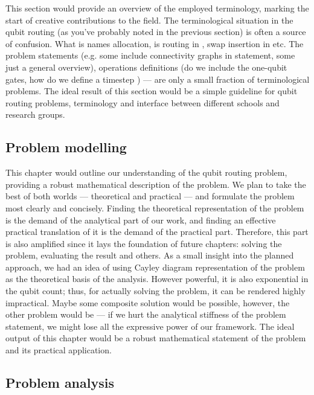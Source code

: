 This section would provide an overview of the employed terminology, marking the start of creative contributions to the field. The terminological situation in the qubit routing (as you’ve probably noted in the previous section) is often a source of confusion. What is \cite{willeMQTQMAPEfficient2023} names allocation, is routing in \cite{cowtanQubitRoutingProblem2019}, swap insertion in \cite{itoAlgorithmicTheoryQubit2023}  etc. The problem statements (e.g. some include connectivity graphs in statement, some just a general overview), operations definitions (do we include the one-qubit gates, how do we define a timestep ) — are only a small fraction of terminological problems. The ideal result of this section would be a simple guideline for qubit routing problems, terminology and interface between different schools and research groups. 

\subsection{Problem modelling}

This chapter would outline our understanding of the qubit routing problem, providing a robust mathematical description of the problem. We plan to take the best of both worlds --- theoretical and practical --- and formulate the problem most clearly and concisely. Finding the theoretical representation of the problem is the demand of the analytical part of our work, and finding an effective practical translation of it is the demand of the practical part. Therefore, this part is also amplified since it lays the foundation of future chapters: solving the problem, evaluating the result and others. As a small insight into the planned approach, we had an idea of using Cayley diagram \cite{akersGrouptheoreticModelSymmetric1989} representation of the problem as the theoretical basis of the analysis. However powerful, it is also exponential in the qubit count; thus, for actually solving the problem, it can be rendered highly impractical. Maybe some composite solution would be possible, however, the other problem would be --- if we hurt the analytical stiffness of the problem statement, we might lose all the expressive power of our framework. The ideal output of this chapter would be a robust mathematical statement of the problem and its practical application.  

\subsection{Problem analysis}

